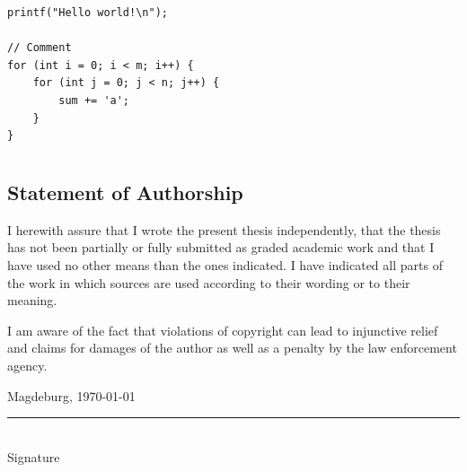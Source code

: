 \documentclass[
	12pt,
	a4paper,
	abstract,
	bibliography=totoc,
	chapterprefix,
	headings=openright,
	numbers=endperiod,
	parskip=half,
	twoside,
]{scrreprt}
\begin{document}
\begin{lstlisting}[caption=Caption]
printf("Hello world!\n");

// Comment
for (int i = 0; i < m; i++) {
	for (int j = 0; j < n; j++) {
		sum += 'a';
	}
}
\end{lstlisting}

\chapter*{}

\section*{Statement of Authorship}

I herewith assure that I wrote the present thesis independently, that the thesis has not been partially or fully submitted as graded academic work and that I have used no other means than the ones indicated.
I have indicated all parts of the work in which sources are used according to their wording or to their meaning.

I am aware of the fact that violations of copyright can lead to injunctive relief and claims for damages of the author as well as a penalty by the law enforcement agency.

\bigskip

Magdeburg, \today

\bigskip
\bigskip

\rule{0.5\textwidth}{0.5pt}\\
\hspace*{0.25em}Signature
\end{document}
